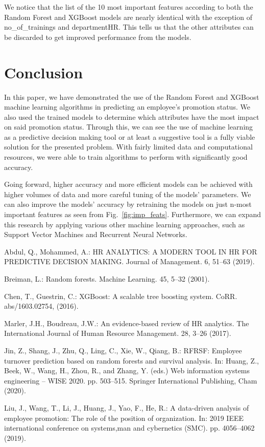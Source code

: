 \documentclass[runningheads]{llncs}
\begin{document}
\newpage

We notice that the list of the 10 most important features according to
both the Random Forest and XGBoost models are nearly identical with the
exception of no\_of\_trainings and departmentHR. This tells us that the
other attributes can be discarded to get improved performance from the
models.

\hypertarget{conclusion}{%
\section{Conclusion}\label{conclusion}}

In this paper, we have demonstrated the use of the Random Forest and
XGBoost machine learning algorithms in predicting an employee's
promotion status. We also used the trained models to determine which
attributes have the most impact on said promotion status. Through this,
we can see the use of machine learning as a predictive decision making
tool or at least a suggestive tool is a fully viable solution for the
presented problem. With fairly limited data and computational resources,
we were able to train algorithms to perform with significantly good
accuracy.

Going forward, higher accuracy and more efficient models can be achieved
with higher volumes of data and more careful tuning of the models'
parameters. We can also improve the models' accuracy by retraining the
models on just n-most important features as seen from
Fig.~\ref{fig:imp_feats}. Furthermore, we can expand this research by
applying various other machine learning approaches, such as Support
Vector Machines and Recurrent Neural Networks.


\begin{thebibliography}{8}
{Abdul, Q., Mohammed, A.: HR ANALYTICS: A MODERN TOOL IN
HR FOR PREDICTIVE DECISION MAKING. Journal of Management. 6, 51--63
(2019).}

{Breiman, L.: Random forests. Machine Learning. 45, 5--32
(2001).}

{Chen, T., Guestrin, C.: XGBoost: {A} scalable tree
boosting system. CoRR. abs/1603.02754, (2016).}

{Marler, J.H., Boudreau, J.W.: An evidence-based review
of HR analytics. The International Journal of Human Resource Management.
28, 3--26 (2017).}

{Jin, Z., Shang, J., Zhu, Q., Ling, C., Xie, W., Qiang,
B.: RFRSF: Employee turnover prediction based on random forests and
survival analysis. In: Huang, Z., Beek, W., Wang, H., Zhou, R., and
Zhang, Y. (eds.) Web information systems engineering -- WISE 2020. pp.
503--515. Springer International Publishing, Cham (2020).}

{Liu, J., Wang, T., Li, J., Huang, J., Yao, F., He, R.: A
data-driven analysis of employee promotion: The role of the position of
organization. In: 2019 IEEE international conference on systems,man and
cybernetics (SMC). pp. 4056--4062 (2019).}

\end{thebibliography}
\end{document}
